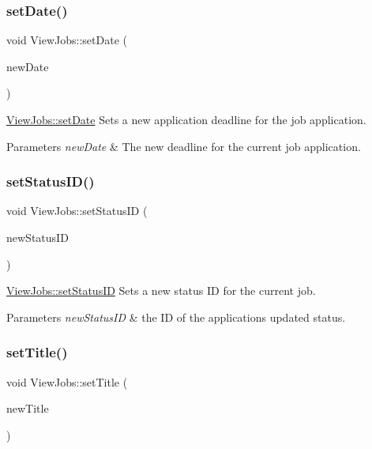 \subsubsection{\texorpdfstring{set\+Date()}{setDate()}}
{\footnotesize\ttfamily void View\+Jobs\+::set\+Date (\begin{DoxyParamCaption}\item[{Q\+String}]{new\+Date }\end{DoxyParamCaption})}



\hyperlink{class_view_jobs_a7574794410eb40956f343976de97221f}{View\+Jobs\+::set\+Date} Sets a new application deadline for the job application. 


\begin{DoxyParams}{Parameters}
{\em new\+Date} & The new deadline for the current job application. \\
\hline
\end{DoxyParams}
\mbox{\label{class_view_jobs_a55943415fd91377d5f701f7074ba58d6}} 
\subsubsection{\texorpdfstring{set\+Status\+I\+D()}{setStatusID()}}
{\footnotesize\ttfamily void View\+Jobs\+::set\+Status\+ID (\begin{DoxyParamCaption}\item[{int}]{new\+Status\+ID }\end{DoxyParamCaption})}



\hyperlink{class_view_jobs_a55943415fd91377d5f701f7074ba58d6}{View\+Jobs\+::set\+Status\+ID} Sets a new status ID for the current job. 


\begin{DoxyParams}{Parameters}
{\em new\+Status\+ID} & the ID of the application\textquotesingle{}s updated status. \\
\hline
\end{DoxyParams}
\mbox{\label{class_view_jobs_abfe1969197cde57ea049c1b7d91cd4f5}} 
\subsubsection{\texorpdfstring{set\+Title()}{setTitle()}}
{\footnotesize\ttfamily void View\+Jobs\+::set\+Title (\begin{DoxyParamCaption}\item[{Q\+String}]{new\+Title }\end{DoxyParamCaption})}



